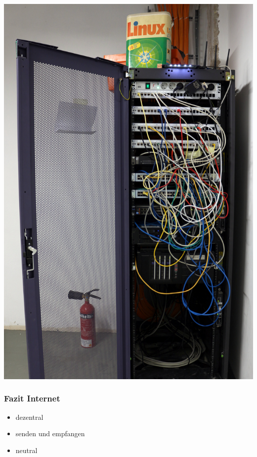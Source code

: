 \documentclass[12pt]{beamer}
\begin{document}
\begin{center}
\begin{frame}
{			\includegraphics[height=0.6\textheight]{img/rack.jpg}
		}
\end{frame}
\end{center}  

\begin{frame}
	\frametitle{Fazit Internet}
	\begin{itemize}
		\item<1-> dezentral
		\item<2-> senden und empfangen
    \item<3-> neutral
	\end{itemize}
\end{frame}
\end{document}
